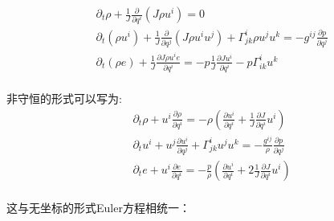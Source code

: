 \documentclass[LBMDerivation.tex]{subfiles}
\begin{document}
\begin{equation}
  \boxed{
    \begin{aligned}
       & \partial_{t} \rho+\frac{1}{J} \frac{\partial}{\partial q^{i}}\left(J \rho u^{i}\right)=0
      \\
       & \partial_{t}\left(\rho u^{i}\right)+\frac{1}{J} \frac{\partial}{\partial q^{j}}\left(J \rho u^{i} u^{j}\right)+\Gamma_{j k}^{i} \rho u^{j} u^{k}=-g^{i j} \frac{\partial p}{\partial q^{j}} \\
       & \partial_{t}\left(\rho e\right) + \frac{1}{J}\frac{\partial J \rho u^i e}{\partial  q^{i}} = -  p\frac{1}{J}\frac{\partial J u^i}{\partial  q^{i}} -p\Gamma_{ik}^i u^k                      \\
    \end{aligned}
  }
  \label{EQUATION::Eluer} ~
\end{equation}
%


%

非守恒的形式可以写为:
\begin{equation}
  \boxed{
    \begin{aligned}
       & \partial_{t} \rho+ u^i \frac{\partial \rho}{\partial q^i}=-\rho (\frac{\partial u^i}{\partial q^i}+  \frac{1}{J} \frac{\partial J}{\partial q^i}u^i)
      \\
       & \partial_{t}u^{i}+u^j \frac{\partial u^i}{\partial q^{j}}+\Gamma_{j k}^{i}  u^{j} u^{k} =-\frac{g^{i j}}{\rho} \frac{\partial p}{\partial q^{j}}                     \\
       & \partial_{t}e + u^i\frac{\partial e}{\partial  q^{i}}  = -  \frac{p}{\rho} (\frac{\partial  u^i}{\partial q^{i}}  + 2\frac{1}{J} \frac{\partial J}{\partial q^i}u^i) \\
    \end{aligned}
  }
  \label{EQUATION::Eluer非守恒} ~
\end{equation}


这与无坐标的形式Euler方程相统一：
\end{document}
